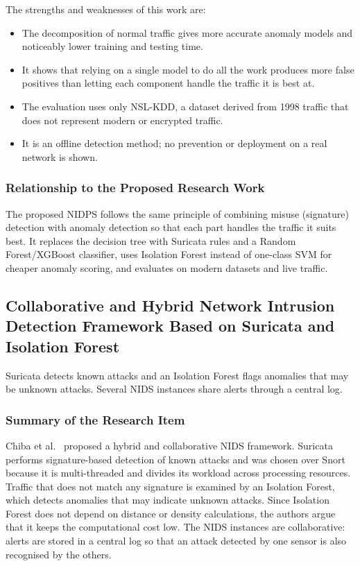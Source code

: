 \noindent The strengths and weaknesses of this work are:

\begin{itemize}
\item The decomposition of normal traffic gives more accurate anomaly models and noticeably lower training and testing time.
\item It shows that relying on a single model to do all the work produces more false positives than letting each component handle the traffic it is best at.
\item The evaluation uses only NSL-KDD, a dataset derived from 1998 traffic that does not represent modern or encrypted traffic.
\item It is an offline detection method; no prevention or deployment on a real network is shown.
\end{itemize}

\subsubsection{Relationship to the Proposed Research Work}\label{sec:3.2.2.3}

\noindent The proposed NIDPS follows the same principle of combining misuse (signature) detection with anomaly detection so that each part handles the traffic it suits best. It replaces the decision tree with Suricata rules and a Random Forest/XGBoost classifier, uses Isolation Forest instead of one-class SVM for cheaper anomaly scoring, and evaluates on modern datasets and live traffic.

\subsection{Collaborative and Hybrid Network Intrusion Detection Framework Based on Suricata and Isolation Forest}\label{sec:3.2.3}

\noindent Suricata detects known attacks and an Isolation Forest flags anomalies that may be unknown attacks. Several NIDS instances share alerts through a central log.

\subsubsection{Summary of the Research Item}\label{sec:3.2.3.1}

\noindent Chiba et al.~\cite{lr:chiba2019} proposed a hybrid and collaborative NIDS framework. Suricata performs signature-based detection of known attacks and was chosen over Snort because it is multi-threaded and divides its workload across processing resources. Traffic that does not match any signature is examined by an Isolation Forest, which detects anomalies that may indicate unknown attacks. Since Isolation Forest does not depend on distance or density calculations, the authors argue that it keeps the computational cost low. The NIDS instances are collaborative: alerts are stored in a central log so that an attack detected by one sensor is also recognised by the others.

